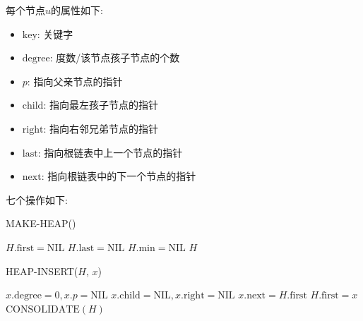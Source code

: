 \documentclass[paper=a4, fontsize=11pt]{scrartcl} %
\numberwithin{equation}{section} %
\numberwithin{figure}{section} %
\numberwithin{table}{section} %
\begin{document}
\begin{enumerate}[a]
\begin{addmargin}[3em]{0em}
      每个节点$u$的属性如下:
      \begin{itemize}
      \item $\mbox{key}$: 关键字
      \item $\mbox{degree}$: 度数/该节点孩子节点的个数
      \item $p$: 指向父亲节点的指针
      \item $\mbox{child}$: 指向最左孩子节点的指针
      \item $\mbox{right}$: 指向右邻兄弟节点的指针
      \item $\mbox{last}$: 指向根链表中上一个节点的指针
      \item $\mbox{next}$: 指向根链表中的下一个节点的指针
      \end{itemize}

    七个操作如下:
    \begin{algorithm}[H]
      \caption{MAKE-HEAP()}
      \begin{algorithmic}
        \State $H.\mbox{first} = \mbox{NIL}$
        \State $H.\mbox{last} = \mbox{NIL}$
        \State $H.\mbox{min} = \mbox{NIL}$
        \State\Return $H$
      \end{algorithmic}
    \end{algorithm}

    \begin{algorithm}[H]
      \caption{HEAP-INSERT($H$, $x$)}
      \begin{algorithmic}
        \State $x.\mbox{degree}=0, x.p = \mbox{NIL}$
        \State $x.\mbox{child}=\mbox{NIL}, x.\mbox{right} = \mbox{NIL}$
        \State $x.\mbox{next}=H.\mbox{first}$
        \State $H.\mbox{first} = x$
        \State $\mbox{CONSOLIDATE}(H)$
      \end{algorithmic}
    \end{algorithm}


\end{addmargin}
\end{enumerate}
\end{document}

